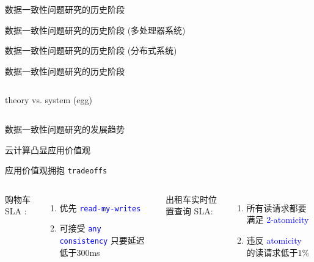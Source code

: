 \begin{frame}{数据一致性问题研究的历史阶段}
\end{frame}
\begin{frame}{数据一致性问题研究的历史阶段 (多处理器系统)}
\end{frame}
\begin{frame}{数据一致性问题研究的历史阶段 (分布式系统)}
\end{frame}
\begin{frame}{数据一致性问题研究的历史阶段}
  \begin{columns}
	  theory vs. system (egg)
  \end{columns}
\end{frame}
\begin{frame}{数据一致性问题研究的发展趋势}
  \begin{center}
	云计算凸显应用价值观

	应用价值观拥抱 \texttt{tradeoffs}
  \end{center}


  \pause

  \begin{columns}[t]
      购物车 SLA :
	  \begin{enumerate}
		\item 优先 \textcolor{blue}{\texttt{read-my-writes}}
		\item 可接受 \textcolor{blue}{\texttt{any consistency}} 只要延迟低于300ms
	  \end{enumerate}
	\pause
	  出租车实时位置查询 SLA:
	  \begin{enumerate}
		\item 所有读请求都要满足 \textcolor{blue}{2-atomicity}
		\item 违反 \textcolor{blue}{atomicity} 的读请求低于$1\%$ 
	  \end{enumerate}
  \end{columns}
\end{frame}
